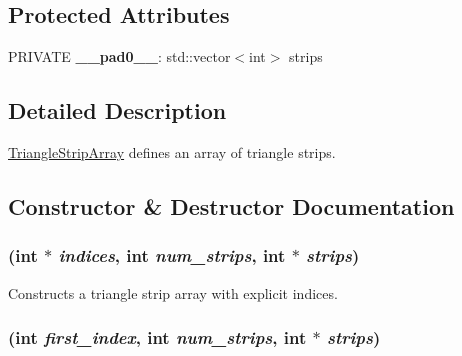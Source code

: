 \subsection*{Protected Attributes}
\begin{CompactItemize}
\item 
\hypertarget{classm3g_1_1TriangleStripArray_09d77e6556195583218cf7f0bc11ab1c}{
PRIVATE \textbf{\_\-\_\-pad0\_\-\_\-}: std::vector$<$int$>$ strips}
\label{classm3g_1_1TriangleStripArray_09d77e6556195583218cf7f0bc11ab1c}

\end{CompactItemize}


\subsection{Detailed Description}
\hyperlink{classm3g_1_1TriangleStripArray}{TriangleStripArray} defines an array of triangle strips. 

\subsection{Constructor \& Destructor Documentation}
\hypertarget{classm3g_1_1TriangleStripArray_57d4e874819367084aeadb11593c4436}{
\subsubsection[{TriangleStripArray}]{ (int $\ast$ {\em indices}, \/  int {\em num\_\-strips}, \/  int $\ast$ {\em strips})}}
\label{classm3g_1_1TriangleStripArray_57d4e874819367084aeadb11593c4436}


Constructs a triangle strip array with explicit indices. \hypertarget{classm3g_1_1TriangleStripArray_d2ca9884a6ccf32da3cee977549b5ee0}{
\subsubsection[{TriangleStripArray}]{ (int {\em first\_\-index}, \/  int {\em num\_\-strips}, \/  int $\ast$ {\em strips})}}
\label{classm3g_1_1TriangleStripArray_d2ca9884a6ccf32da3cee977549b5ee0}


